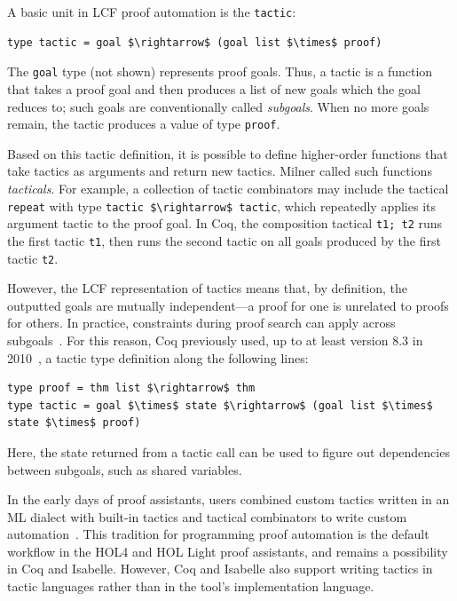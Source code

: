 A basic unit in LCF proof automation is the \lstinline{tactic}:
%
\begin{lstlisting}
type tactic = goal $\rightarrow$ (goal list $\times$ proof)
\end{lstlisting}
%
The \lstinline{goal} type (not shown) represents proof goals.
Thus, a tactic is a function that takes a proof goal and then produces a list
of new goals which the goal reduces to; such goals are conventionally called \emph{subgoals}.
When no more goals remain, the tactic produces a value of type \lstinline{proof}.

Based on this tactic definition, it is possible to define higher-order functions that take tactics as arguments
and return new tactics. Milner called such functions \emph{tacticals}. For example, a collection
of tactic combinators may include the tactical \lstinline{repeat} with type \lstinline{tactic $\rightarrow$ tactic},
which repeatedly applies its argument tactic to the proof goal. In Coq, the composition tactical \lstinline{t1; t2}
runs the first tactic \lstinline{t1}, then runs the second tactic on all goals
produced by the first tactic \lstinline{t2}.


However, the LCF representation of tactics means that, by definition, the outputted goals are mutually independent---a proof for one
is unrelated to proofs for others. In practice, constraints during proof
search can apply across subgoals~\citep{SpiwackTactic}. For this reason, Coq previously used, up to at least version 8.3 in 2010~\citep{Spiwack2010},
a tactic type definition along the following lines: %
\begin{lstlisting}
type proof = thm list $\rightarrow$ thm
type tactic = goal $\times$ state $\rightarrow$ (goal list $\times$ state $\times$ proof)
\end{lstlisting}
Here, the state returned from a tactic call can be used to figure out dependencies between subgoals, such as shared variables.

In the early days of proof assistants, users combined custom tactics written in an ML dialect with built-in tactics and tactical combinators to write custom 
automation~\citep{Constable1986, cornes1995coq, paulson1988preliminary, paulson1983tactics}. This tradition for programming proof automation is the default workflow in the HOL4 and HOL Light proof assistants, and remains a possibility in Coq and Isabelle. However, Coq and Isabelle also support writing tactics in tactic languages rather than in the tool's implementation language.

